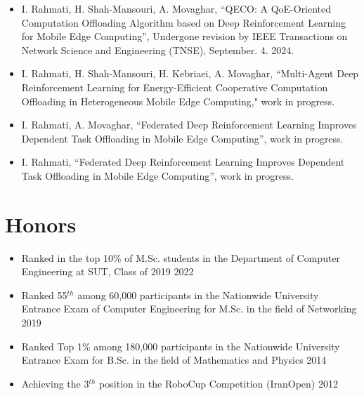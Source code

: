 \documentclass[11pt]{article}
\begin{document}
  \begin{itemize}
  	
  	\item I. Rahmati, H. Shah-Mansouri, A. Movaghar, ``QECO: A QoE-Oriented Computation Offloading Algorithm based on Deep Reinforcement Learning for Mobile Edge Computing'', Undergone revision by IEEE Transactions on Network Science and Engineering (TNSE), September. 4. 2024.
  	\href{https://arxiv.org/pdf/2311.02525}{\small  \faExternalLink}
  	\href{https://github.com/ImanRHT/QECO}{\faGithub}
  	
  	
  	\item I. Rahmati, H. Shah-Mansouri, H. Kebriaei, A. Movaghar, ``Multi-Agent Deep Reinforcement Learning for Energy-Efficient Cooperative Computation Offloading in Heterogeneous Mobile Edge Computing," work in progress. \href{https://imanrht.github.io/assets/Multi_AgentDRL.pdf}{\small  \faExternalLink}
  	
  	\item I. Rahmati, A. Movaghar, ``Federated Deep Reinforcement Learning Improves Dependent Task Offloading in Mobile Edge Computing'', work in progress.  \href{https://imanrht.github.io/assets/FederatedDRL.pdf}{\small  \faExternalLink}
  	
  	\item I. Rahmati, ``Federated Deep Reinforcement Learning Improves Dependent Task Offloading in Mobile Edge Computing'', work in progress.  \href{https://imanrht.github.io/assets/MetaRL.pdf}{\small  \faExternalLink}
  	
  	


		

  \end{itemize}

\section{Honors}
\begin{itemize}
	\renewcommand\labelitemi{\ding{118}}
	\item{Ranked in the top 10\% of M.Sc. students in the Department of Computer Engineering at SUT, Class of 2019  \hfill  2022}\vspace{-2mm}
	\item {Ranked 55$^{th}$ among 60,000 participants in the Nationwide University Entrance Exam of Computer Engineering for M.Sc. in the field of Networking \hfill  2019}\vspace{-2mm}
	\item{Ranked Top 1\% among 180,000 participants in the Nationwide University Entrance Exam for B.Sc. in the field of Mathematics and Physics  \hfill  2014}\vspace{-2mm}
	\item{Achieving the 3$^{th}$ position in the RoboCup Competition (IranOpen)  \hfill  2012}\vspace{-2mm}
\end{itemize}
\end{document}
